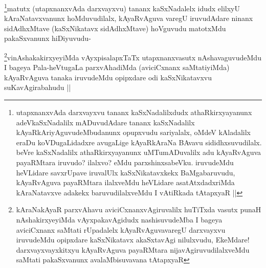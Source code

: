 \begin{artha}
\footnote{utapxnanxvAda darxvayxvu tananx kaSxNadalilxdudx athaRkirxyayanunx adeVkaSxNadalilx mADuvudAdare tananx kaSxNadalilx kAyaRkAriyAguvudeMbudanunx opupxvudu sariyalalx, oMdeV kAladalilx eraDu koVDugaLidadxre avugaLige kAyaRkAraNa BAvavu sididhxsuvudilalx. beVre kaSxNadalilx athaRkirxyayanunx uMTumADuvalilx adu kAyaRvAguva payaRMtara iruvudo? ilalxvo? eMdu parxshinxsabeVku. iruvudeMdu heVLidare savxrUpave iruvalUlx kaSxNikatavxkekx BaMgabaruvudu, kAyaRvAguva payaRMtara ilalxveMdu heVLidare asatAtxdadxriMda kAraNatavxve adakekx baruvudilalxveMdu I vAtiRkada tAtapxyaR ||}matutx (utapxnanxvAda darxvayxvu) tananx kaSxNadalelx idudx elilxyU kAraNatavxvanunx hoMduvudilalx, kAyaRvAguva varegU iruvudAdare ninanx sidAdhxMtave (kaSxNikatavx sidAdhxMtave) hoVguvudu matotxMdu pakaSxvanunx hiDiyuvudu-
\end{artha}

\begin{artha}
\footnote{kAraNakAyaR parxvAhavu aviciCxnanxvAgiruvalilx huTiTxda vasutx punaH nAshakirxyeyiMda vAyxpakavAgidudx nashisuvudeMba I bageya aviciCxnanx saMtati rUpadalelx kAyaRvAguvavaregU darxvayxvu iruvudeMdu opipxdare kaSxNikatavx akaSxtavAgi nilulxvudu, EkeMdare! darxvayxvayxkitxyu kAyaRvAguva payaRMtara nijavAgiruvudilalxveMdu saMtati pakaSxvanunx avalaMbisuvavana tAtapxyaR}vinAshakakirxyeyiMda vAyxpisalapxTaTx utapxnanxvasutx nAshavaguvudeMdu I bageya Pala-heVtugaLa parxvAhadiMda (aviciCxnanx saMtatiyiMda) kAyaRvAguva tanaka iruvudeMdu opipxdare odi kaSxNikatavxvu suKavAgirabahudu ||
\end{artha}

